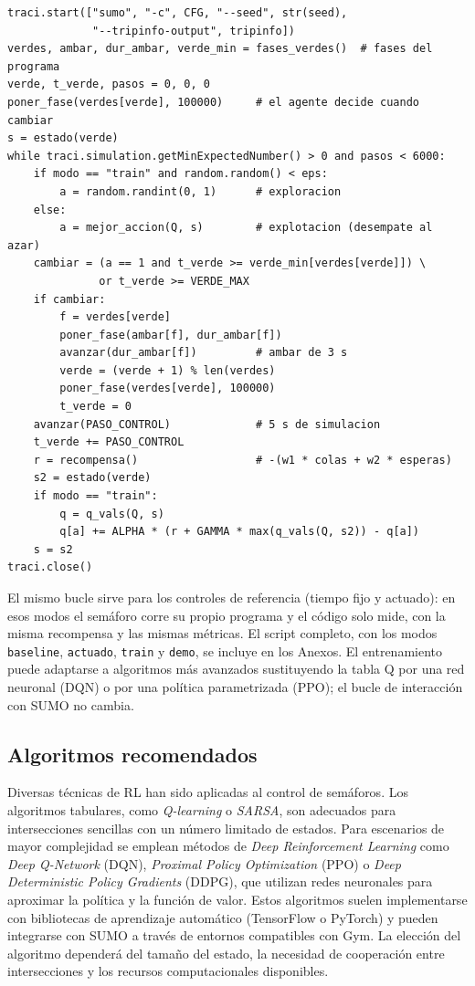 \begin{verbatim}
traci.start(["sumo", "-c", CFG, "--seed", str(seed),
             "--tripinfo-output", tripinfo])
verdes, ambar, dur_ambar, verde_min = fases_verdes()  # fases del programa
verde, t_verde, pasos = 0, 0, 0
poner_fase(verdes[verde], 100000)     # el agente decide cuando cambiar
s = estado(verde)
while traci.simulation.getMinExpectedNumber() > 0 and pasos < 6000:
    if modo == "train" and random.random() < eps:
        a = random.randint(0, 1)      # exploracion
    else:
        a = mejor_accion(Q, s)        # explotacion (desempate al azar)
    cambiar = (a == 1 and t_verde >= verde_min[verdes[verde]]) \
              or t_verde >= VERDE_MAX
    if cambiar:
        f = verdes[verde]
        poner_fase(ambar[f], dur_ambar[f])
        avanzar(dur_ambar[f])         # ambar de 3 s
        verde = (verde + 1) % len(verdes)
        poner_fase(verdes[verde], 100000)
        t_verde = 0
    avanzar(PASO_CONTROL)             # 5 s de simulacion
    t_verde += PASO_CONTROL
    r = recompensa()                  # -(w1 * colas + w2 * esperas)
    s2 = estado(verde)
    if modo == "train":
        q = q_vals(Q, s)
        q[a] += ALPHA * (r + GAMMA * max(q_vals(Q, s2)) - q[a])
    s = s2
traci.close()
\end{verbatim}

El mismo bucle sirve para los controles de referencia (tiempo fijo y
actuado): en esos modos el semáforo corre su propio programa y el
código solo mide, con la misma recompensa y las mismas métricas. El
script completo, con los modos \texttt{baseline}, \texttt{actuado},
\texttt{train} y \texttt{demo}, se incluye en los Anexos. El
entrenamiento puede adaptarse a algoritmos más avanzados sustituyendo
la tabla Q por una red neuronal (DQN) o por una política parametrizada
(PPO); el bucle de interacción con SUMO no cambia.

\subsection*{Algoritmos recomendados}

Diversas técnicas de RL han sido aplicadas al control de
semáforos. Los algoritmos tabulares, como \emph{Q-learning} o
\emph{SARSA}, son adecuados para intersecciones sencillas con un
número limitado de estados. Para escenarios de mayor complejidad se
emplean métodos de \emph{Deep Reinforcement Learning} como \emph{Deep
Q-Network} (DQN), \emph{Proximal Policy Optimization} (PPO) o
\emph{Deep Deterministic Policy Gradients} (DDPG), que utilizan redes
neuronales para aproximar la política y la función de valor. Estos
algoritmos suelen implementarse con bibliotecas de aprendizaje
automático (TensorFlow o PyTorch) y pueden integrarse con SUMO a
través de entornos compatibles con Gym. La elección del algoritmo
dependerá del tamaño del estado, la necesidad de cooperación entre
intersecciones y los recursos computacionales disponibles.

